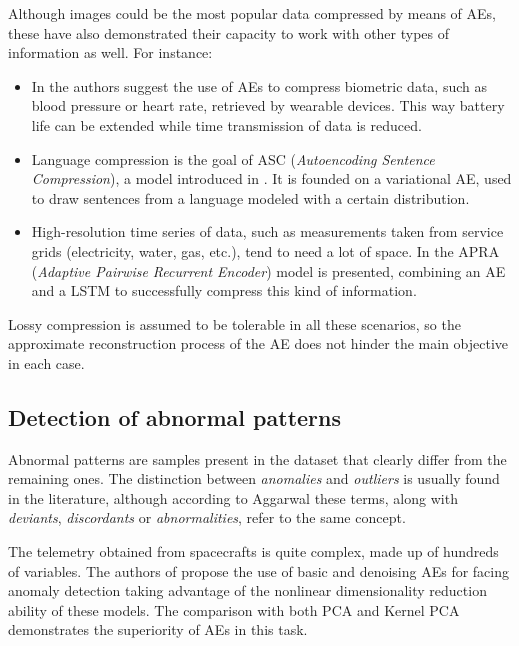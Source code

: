 Although images could be the most popular data compressed by means of AEs, these have also demonstrated their capacity to work with other types of information as well. For instance:
\begin{itemize}
    \item In   the authors suggest the use of AEs to compress biometric data, such as blood pressure or heart rate, retrieved by wearable devices. This way  battery life can be extended while time transmission of data is reduced. 
    
    \item Language compression is the goal of ASC (\textit{Autoencoding Sentence Compression}), a model introduced in . It is founded on a variational AE, used to draw sentences from a language modeled with a certain distribution.
    
    \item High-resolution time series of data, such as measurements taken from service grids (electricity, water, gas, etc.), tend to need a lot of space. In  the APRA (\textit{Adaptive Pairwise Recurrent Encoder}) model is presented, combining an AE and a LSTM to successfully compress this kind of information.
\end{itemize}

Lossy compression is assumed to be tolerable in all these scenarios, so the approximate reconstruction process of the AE does not hinder the main objective in each case.

\subsection{Detection of abnormal patterns}
Abnormal patterns are samples present in the dataset that clearly differ from the remaining ones. The distinction between \textit{anomalies} and \textit{outliers} is usually found in the literature, although according to Aggarwal  these terms, along with \textit{deviants}, \textit{discordants} or \textit{abnormalities}, refer to the same concept.

The telemetry obtained from spacecrafts is quite complex, made up of hundreds of variables. The authors of  propose the use of basic and denoising AEs for facing anomaly detection taking advantage of the nonlinear dimensionality reduction ability of these models. The comparison with both PCA and Kernel PCA demonstrates the superiority of AEs in this task.


